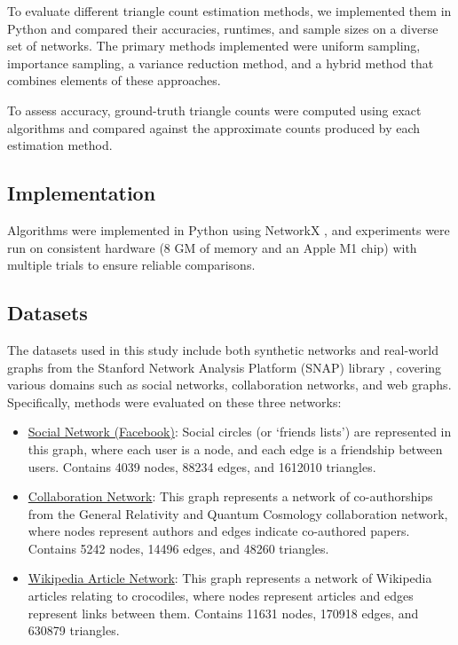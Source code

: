 \documentclass[11pt, margin=1in]{article}
\begin{document}
To evaluate different triangle count estimation methods, we implemented them in Python and compared their accuracies, runtimes, and sample sizes on a diverse set of networks.
The primary methods implemented were uniform sampling, importance sampling, a variance reduction method, and a hybrid method that combines elements of these approaches. 

To assess accuracy, ground-truth triangle counts were computed using exact algorithms and compared against the approximate counts produced by each estimation method.

\subsection{Implementation}

Algorithms were implemented in Python using NetworkX \cite{hagberg_exploring_2008}, and experiments were run on consistent hardware (8 GM of memory and an Apple M1 chip) with multiple trials to ensure reliable comparisons.

\subsection{Datasets}

The datasets used in this study include both synthetic networks and real-world graphs from the Stanford Network Analysis Platform (SNAP) library \cite{leskovec_snap_2017}, covering various domains such as social networks, collaboration networks, and web graphs.
Specifically, methods were evaluated on these three networks:

\begin{itemize}
    \item \href{https://snap.stanford.edu/data/ego-Facebook.html}{Social Network (Facebook)}: Social circles (or `friends lists') are represented in this graph, where each user is a node, and each edge is a friendship between users. Contains 4039 nodes, 88234 edges, and 1612010 triangles.
    \item \href{https://snap.stanford.edu/data/ca-GrQc.html}{Collaboration Network}: This graph represents a network of co-authorships from the General Relativity and Quantum Cosmology collaboration network, where nodes represent authors and edges indicate co-authored papers. Contains 5242 nodes, 14496 edges, and 48260 triangles.
    \item \href{https://snap.stanford.edu/data/wikipedia-article-networks.html}{Wikipedia Article Network}: This graph represents a network of Wikipedia articles relating to crocodiles, where nodes represent articles and edges represent links between them. Contains 11631 nodes, 170918 edges, and 630879 triangles.
\end{itemize}
\end{document}
